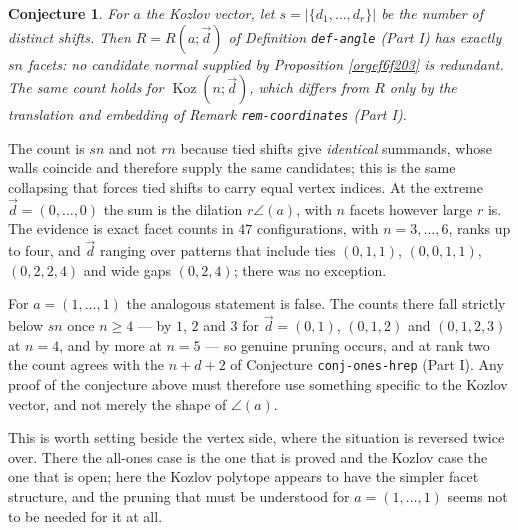 \documentclass[11pt, a4paper, abstract=yes]{scrartcl}
\theoremstyle{definition}
\theoremstyle{remark}
\theoremstyle{plain}
\newtheorem{conjecture}[definition]{Conjecture}
\newcommand{\Koz}{\operatorname{Koz}}
\begin{document}
\begin{conjecture}
For \(a\) the Kozlov vector, let \(s=\lvert\lbrace d_1,\dots,d_r\rbrace\rvert\) be the number of
\emph{distinct} shifts. Then \(R=R(a;\vec d)\) of Definition \texttt{def-angle} (Part I) has exactly \(sn\) facets: no
candidate normal supplied by Proposition \ref{orgef6f203} is redundant. The same count holds for
\(\Koz(n;\vec d)\), which differs from \(R\) only by the translation and embedding of Remark
\texttt{rem-coordinates} (Part I).
\label{org36a14fc}
\end{conjecture}

The count is \(sn\) and not \(rn\) because tied shifts give \emph{identical} summands, whose walls
coincide and therefore supply the same candidates; this is the same collapsing that forces tied
shifts to carry equal vertex indices. At the extreme \(\vec d=(0,\dots,0)\) the sum is the dilation
\(r\angle(a)\), with \(n\) facets however large \(r\) is. The evidence is exact facet counts in
\(47\) configurations, with \(n=3,\dots,6\), ranks up to four, and \(\vec d\) ranging over patterns
that include ties \((0,1,1)\), \((0,0,1,1)\), \((0,2,2,4)\) and wide gaps \((0,2,4)\); there was no
exception.

For \(a=(1,\dots,1)\) the analogous statement is false. The counts there fall strictly below \(sn\)
once \(n\ge4\) --- by \(1\), \(2\) and \(3\) for \(\vec d=(0,1)\), \((0,1,2)\) and \((0,1,2,3)\) at
\(n=4\), and by more at \(n=5\) --- so genuine pruning occurs, and at rank two the count agrees with
the \(n+d+2\) of Conjecture \texttt{conj-ones-hrep} (Part I). Any proof of the conjecture above must therefore use
something specific to the Kozlov vector, and not merely the shape of \(\angle(a)\).

This is worth setting beside the vertex side, where the situation is reversed twice over. There the
all-ones case is the one that is proved and the Kozlov case the one that is open; here the Kozlov
polytope appears to have the simpler facet structure, and the pruning that must be understood for
\(a=(1,\dots,1)\) seems not to be needed for it at all.
\end{document}
